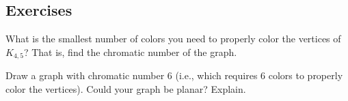 \documentclass[10pt,]{book}
\theoremstyle{plain}
\theoremstyle{definition}
\theoremstyle{definition}
\theoremstyle{definition}
\theoremstyle{definition}
\numberwithin{equation}{chapter}
\begin{document}
\subsection*{Exercises}\label{exercises_gt-coloring}
\begin{divisionexercise}{1}\hypertarget{exercise-40}{}
\hypertarget{p-348}{}%
What is the smallest number of colors you need to properly color the vertices of \(K_{4,5}\)? That is, find the chromatic number of the graph.%
\end{divisionexercise}%
\begin{divisionexercise}{2}\hypertarget{exercise-41}{}
\hypertarget{p-350}{}%
Draw a graph with chromatic number 6 (i.e., which requires 6 colors to properly color the vertices). Could your graph be planar? Explain.%
\end{divisionexercise}%
\end{document}
